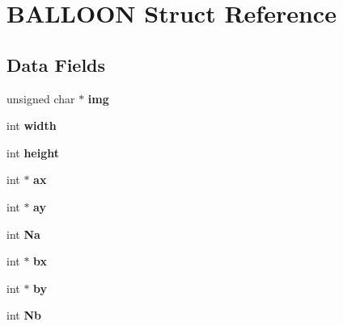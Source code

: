\hypertarget{struct_b_a_l_l_o_o_n}{}\section{B\+A\+L\+L\+O\+ON Struct Reference}
\label{struct_b_a_l_l_o_o_n}
\subsection*{Data Fields}
\begin{DoxyCompactItemize}
\item 
unsigned char $\ast$ {\bfseries img}\hypertarget{struct_b_a_l_l_o_o_n_ac46d50ca34550afcf41745e3a6b4945d}{}\label{struct_b_a_l_l_o_o_n_ac46d50ca34550afcf41745e3a6b4945d}

\item 
int {\bfseries width}\hypertarget{struct_b_a_l_l_o_o_n_a3aa32ca888a9814d614a950ea0604dad}{}\label{struct_b_a_l_l_o_o_n_a3aa32ca888a9814d614a950ea0604dad}

\item 
int {\bfseries height}\hypertarget{struct_b_a_l_l_o_o_n_aba3e8ab706759466cce70a6a6659db48}{}\label{struct_b_a_l_l_o_o_n_aba3e8ab706759466cce70a6a6659db48}

\item 
int $\ast$ {\bfseries ax}\hypertarget{struct_b_a_l_l_o_o_n_a16c8dde029c0db3f4cd2b7e5a6f40657}{}\label{struct_b_a_l_l_o_o_n_a16c8dde029c0db3f4cd2b7e5a6f40657}

\item 
int $\ast$ {\bfseries ay}\hypertarget{struct_b_a_l_l_o_o_n_a70c7eb1aef5383b175c39d798bab3542}{}\label{struct_b_a_l_l_o_o_n_a70c7eb1aef5383b175c39d798bab3542}

\item 
int {\bfseries Na}\hypertarget{struct_b_a_l_l_o_o_n_a76b75cde6c3eb4c4ce4c6dd65bb02b5a}{}\label{struct_b_a_l_l_o_o_n_a76b75cde6c3eb4c4ce4c6dd65bb02b5a}

\item 
int $\ast$ {\bfseries bx}\hypertarget{struct_b_a_l_l_o_o_n_aa164004d293b763232f1cd826ee9e62b}{}\label{struct_b_a_l_l_o_o_n_aa164004d293b763232f1cd826ee9e62b}

\item 
int $\ast$ {\bfseries by}\hypertarget{struct_b_a_l_l_o_o_n_a812399e00c07b144e6798e47fdd887c2}{}\label{struct_b_a_l_l_o_o_n_a812399e00c07b144e6798e47fdd887c2}

\item 
int {\bfseries Nb}\hypertarget{struct_b_a_l_l_o_o_n_a85e567fb946d66b7253609afc8881f16}{}\label{struct_b_a_l_l_o_o_n_a85e567fb946d66b7253609afc8881f16}


\end{DoxyCompactItemize}
